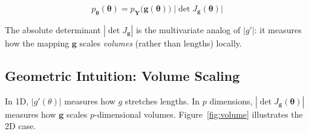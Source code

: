 \documentclass[11pt,a4paper]{article}
\theoremstyle{definition}
\newcommand{\btheta}{\boldsymbol{\theta}}
\begin{document}
\begin{keyresult}
\begin{equation}
    \label{eq:multi_formula}
    p_{\btheta}(\btheta) = p_{\mathbf{Y}}\!\big(\mathbf{g}(\btheta)\big) \;
    \big|\!\det J_{\mathbf{g}}(\btheta)\big|
\end{equation}
\end{keyresult}

The absolute determinant $|\!\det J_{\mathbf{g}}|$ is the multivariate analog
of $|g'|$: it measures how the mapping $\mathbf{g}$ scales \emph{volumes}
(rather than lengths) locally.

\subsection{Geometric Intuition: Volume Scaling}

In 1D, $|g'(\theta)|$ measures how $g$ stretches lengths. In $p$ dimensions,
$|\!\det J_{\mathbf{g}}(\btheta)|$ measures how $\mathbf{g}$ scales
$p$-dimensional volumes. Figure~\ref{fig:volume} illustrates the 2D case.
\end{document}
